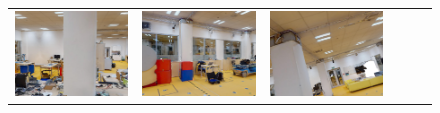 \documentclass[twoside]{ctuthesis}
\theoremstyle{plain}
\theoremstyle{definition}
\theoremstyle{note}
\begin{document}
{\begin{figure}
{\begin{tabular}{c|c|c|c|c|c}
    \includegraphics[width=\thiswidth]{evaluation/queryPipeline/3.jpg/synthesized} & 
    \includegraphics[width=\thiswidth]{evaluation/queryPipeline/6.jpg/synthesized} & 
    \includegraphics[width=\thiswidth]{evaluation/queryPipeline/31.jpg/synthesized} & 

\end{tabular}}
\end{figure}}
\end{document}
